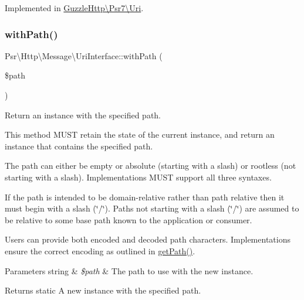 Implemented in \hyperlink{classGuzzleHttp_1_1Psr7_1_1Uri_a6676d1155c9a628ff53a1d18795a4b6c}{Guzzle\+Http\textbackslash{}\+Psr7\textbackslash{}\+Uri}.

\mbox{\label{interfacePsr_1_1Http_1_1Message_1_1UriInterface_a9d2a8bda965816471ea40e3560d710ca}} 
\subsubsection{\texorpdfstring{with\+Path()}{withPath()}}
{\footnotesize\ttfamily Psr\textbackslash{}\+Http\textbackslash{}\+Message\textbackslash{}\+Uri\+Interface\+::with\+Path (\begin{DoxyParamCaption}\item[{}]{\$path }\end{DoxyParamCaption})}

Return an instance with the specified path.

This method M\+U\+ST retain the state of the current instance, and return an instance that contains the specified path.

The path can either be empty or absolute (starting with a slash) or rootless (not starting with a slash). Implementations M\+U\+ST support all three syntaxes.

If the path is intended to be domain-\/relative rather than path relative then it must begin with a slash (\char`\"{}/\char`\"{}). Paths not starting with a slash (\char`\"{}/\char`\"{}) are assumed to be relative to some base path known to the application or consumer.

Users can provide both encoded and decoded path characters. Implementations ensure the correct encoding as outlined in \hyperlink{interfacePsr_1_1Http_1_1Message_1_1UriInterface_aa50072ff08f6acf7c35aa5ebd0ae91cd}{get\+Path()}.


\begin{DoxyParams}[1]{Parameters}
string & {\em \$path} & The path to use with the new instance. \\
\hline
\end{DoxyParams}
\begin{DoxyReturn}{Returns}
static A new instance with the specified path. 
\end{DoxyReturn}


